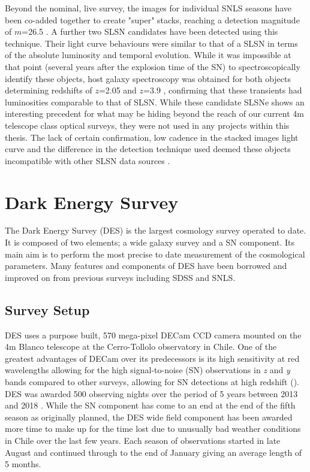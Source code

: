 Beyond the nominal, live survey, the images for individual SNLS seasons have been co-added together to create "super" stacks, reaching a detection magnitude of $m$=26.5 \citep{Cooke2012}. A further two SLSN candidates have been detected using this technique. Their light curve behaviours were similar to that of a SLSN in terms of the absolute luminosity and temporal evolution. While it was impossible at that point (several years after the explosion time of the SN) to spectroscopically identify these objects, host galaxy spectroscopy was obtained for both objects determining redshifts of $z$=2.05 and $z$=3.9 \citep{Cooke2012}, confirming that these transients had luminosities comparable to that of SLSN. While these candidate SLSNe shows an interesting precedent for what may be hiding beyond the reach of our current 4m telescope class optical surveys, they were not used in any projects within this thesis. The lack of certain confirmation, low cadence in the stacked images light curve and the difference in the detection technique used deemed these objects incompatible with other SLSN data sources \citep{Prajs2016}.

\section{Dark Energy Survey}
The Dark Energy Survey (DES) is the largest cosmology survey operated to date. It is composed of two elements; a wide galaxy survey and a SN component. Its main aim is to perform the most precise to date measurement of the cosmological parameters. Many features and components of DES have been borrowed and improved on from previous surveys including SDSS and SNLS.

\subsection{Survey Setup}
DES uses a purpose built, 570 mega-pixel DECam CCD camera \citep{Honscheid2008,Flaugher2015} mounted on the 4m Blanco telescope at the Cerro-Tollolo observatory in Chile. One of the greatest advantages of DECam over its predecessors is its high sensitivity at red wavelengths allowing for the high signal-to-noise (S\/N) observations in \textit{z} and \textit{y} bands compared to other surveys, allowing for SN detections at high redshift (). DES was awarded 500 observing nights over the period of 5 years between 2013 and 2018 \citep{DES2016}. While the SN component has come to an end at the end of the fifth season as originally planned, the DES wide field component has been awarded more time to make up for the time lost due to unusually bad weather conditions in Chile over the last few years. Each season of observations started in late August and continued through to the end of January giving an average length of 5 months.

